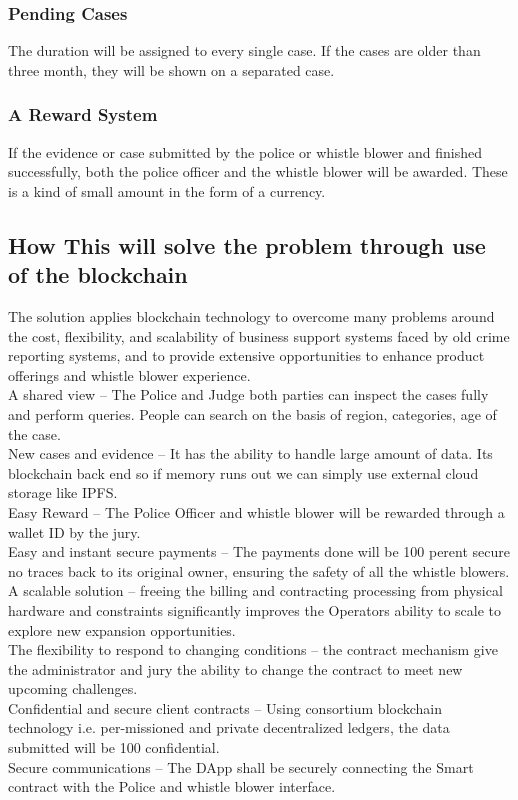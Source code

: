 \subsubsection{Pending Cases}
The duration will be assigned to every single case. If the cases are older than three month, they will be shown on a separated case. 
\subsubsection{A Reward System}
If the evidence or case submitted by the police or whistle blower and finished successfully, both the police officer and the whistle blower will be awarded. These is a kind of small amount in the form of a currency. 


\subsection{How This will solve the problem through use of the blockchain}
The solution applies blockchain technology to overcome many problems around the cost, flexibility, and scalability of business support systems faced by old crime reporting systems, and to provide extensive opportunities to enhance product offerings and whistle blower experience. \\
A shared view – The Police and Judge both parties can inspect the cases fully and perform queries. People can search on the basis of region, categories, age of the case. \\
New cases and evidence – It has the ability to handle large amount of data. Its blockchain back end so if memory runs out we can simply use external cloud storage like IPFS. \\ 
Easy Reward – The Police Officer and whistle blower will be rewarded through a wallet ID by the jury.  \\
Easy and instant secure payments – The payments done will be 100 perent secure no traces back to its original owner, ensuring the safety of all the whistle blowers.   \\
A scalable solution – freeing the billing and contracting processing from physical hardware and constraints significantly improves the Operators ability to scale to explore new expansion opportunities. \\
The flexibility to respond to changing conditions – the contract mechanism give the administrator and jury the ability to change the contract to meet new upcoming challenges. \\ 
Confidential and secure client contracts – Using consortium blockchain technology i.e. per-missioned and private decentralized ledgers, the data submitted will be 100 confidential.\\ 
Secure communications – The DApp shall be securely connecting the Smart contract with the Police and whistle blower interface.  

